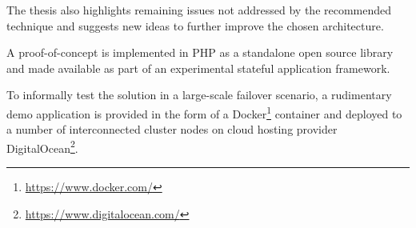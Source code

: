 The thesis also highlights remaining issues not addressed by the recommended technique and suggests new ideas to further improve the chosen architecture.

A proof-of-concept is implemented in PHP as a standalone open source library and made available as part of an experimental stateful application framework.

To informally test the solution in a large-scale failover scenario, a rudimentary demo application is provided in the form of a Docker\footnote{\url{https://www.docker.com/}} container and deployed to a number of interconnected cluster nodes on cloud hosting provider DigitalOcean\footnote{\url{https://www.digitalocean.com/}}.
